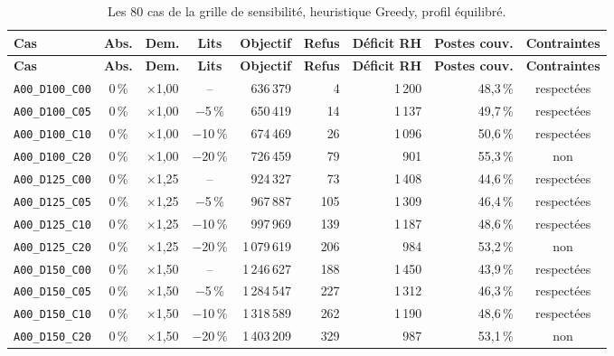 {\footnotesize
\begin{longtable}{lcccrrrrc}
\caption{Les 80 cas de la grille de sensibilité, heuristique Greedy, profil équilibré.}\label{tab:sensibilite_complete}\\
\toprule
\textbf{Cas} & \textbf{Abs.} & \textbf{Dem.} & \textbf{Lits} & \textbf{Objectif} & \textbf{Refus} & \textbf{Déficit RH} & \textbf{Postes couv.} & \textbf{Contraintes} \\
\midrule\endfirsthead
\toprule
\textbf{Cas} & \textbf{Abs.} & \textbf{Dem.} & \textbf{Lits} & \textbf{Objectif} & \textbf{Refus} & \textbf{Déficit RH} & \textbf{Postes couv.} & \textbf{Contraintes} \\
\midrule\endhead
\bottomrule\endfoot
\texttt{A00\_D100\_C00} & 0\,\% & $\times$1{,}00 & -- & 636\,379 & 4 & 1\,200 & 48{,}3\,\% & respectées \\
\texttt{A00\_D100\_C05} & 0\,\% & $\times$1{,}00 & $-$5\,\% & 650\,419 & 14 & 1\,137 & 49{,}7\,\% & respectées \\
\texttt{A00\_D100\_C10} & 0\,\% & $\times$1{,}00 & $-$10\,\% & 674\,469 & 26 & 1\,096 & 50{,}6\,\% & respectées \\
\texttt{A00\_D100\_C20} & 0\,\% & $\times$1{,}00 & $-$20\,\% & 726\,459 & 79 & 901 & 55{,}3\,\% & non \\
\texttt{A00\_D125\_C00} & 0\,\% & $\times$1{,}25 & -- & 924\,327 & 73 & 1\,408 & 44{,}6\,\% & respectées \\
\texttt{A00\_D125\_C05} & 0\,\% & $\times$1{,}25 & $-$5\,\% & 967\,887 & 105 & 1\,309 & 46{,}4\,\% & respectées \\
\texttt{A00\_D125\_C10} & 0\,\% & $\times$1{,}25 & $-$10\,\% & 997\,969 & 139 & 1\,187 & 48{,}6\,\% & respectées \\
\texttt{A00\_D125\_C20} & 0\,\% & $\times$1{,}25 & $-$20\,\% & 1\,079\,619 & 206 & 984 & 53{,}2\,\% & non \\
\texttt{A00\_D150\_C00} & 0\,\% & $\times$1{,}50 & -- & 1\,246\,627 & 188 & 1\,450 & 43{,}9\,\% & respectées \\
\texttt{A00\_D150\_C05} & 0\,\% & $\times$1{,}50 & $-$5\,\% & 1\,284\,547 & 227 & 1\,312 & 46{,}3\,\% & respectées \\
\texttt{A00\_D150\_C10} & 0\,\% & $\times$1{,}50 & $-$10\,\% & 1\,318\,589 & 262 & 1\,190 & 48{,}6\,\% & respectées \\
\texttt{A00\_D150\_C20} & 0\,\% & $\times$1{,}50 & $-$20\,\% & 1\,403\,209 & 329 & 987 & 53{,}1\,\% & non \\

\end{longtable}}
